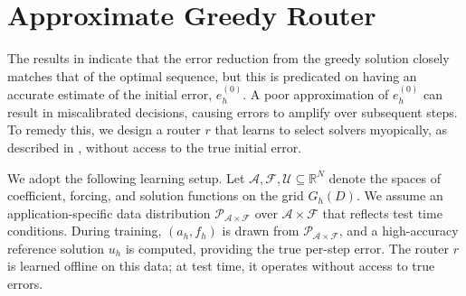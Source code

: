 \documentclass{article} %
\newcommand\ambuj[1]{\textcolor{red}{AT: #1}}
\begin{document}
\section{Approximate Greedy Router} \label{sec:approxgreedy}

The results in  indicate that the error reduction from the greedy solution closely matches that of the optimal sequence, but this is predicated on having an accurate estimate of the initial error, $e^{(0)}_h$. A poor approximation of $e^{(0)}_h$ can result in miscalibrated decisions, causing errors to amplify over subsequent steps. To remedy this, we design a router $r$ that learns to select solvers myopically, as described in , without access to the true initial error. 

We adopt the following learning setup. Let $\mathcal{A}, \mathcal{F}, \mathcal{U} \subseteq \mathbb{R}^N$ denote the spaces of coefficient, forcing, and solution functions on the grid $G_h(D)$. We assume an application-specific data distribution $\mathcal{P}_{\mathcal{A} \times \mathcal{F}}$ over $\mathcal{A} \times \mathcal{F}$ that reflects test time conditions.
During training, $(a_h, f_h)$ is drawn from $\mathcal{P}_{\mathcal{A} \times \mathcal{F}}$, and a high-accuracy reference solution $u_h$ is computed, providing the true per-step error. The router $r$ is learned offline on this data; at test time, it operates without access to true errors.

\end{document}
